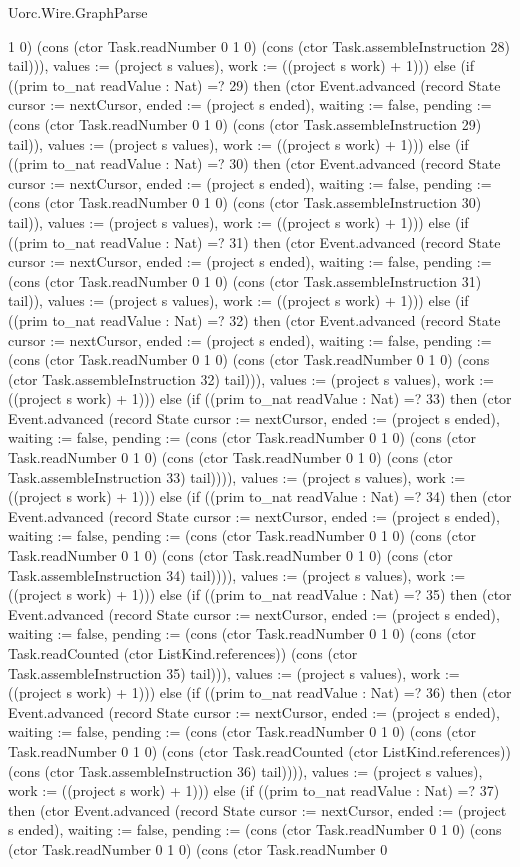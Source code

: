 \begin{lexlean}{Uorc.Wire.GraphParse}
\begin{semanticmodule}
{1 0) (cons (ctor Task.readNumber 0 1 0) (cons (ctor Task.assembleInstruction 28) tail))), values := (project s values), work := ((project s work) + 1)})) else (if ((prim to_nat readValue : Nat) =? 29) then (ctor Event.advanced (record State {cursor := nextCursor, ended := (project s ended), waiting := false, pending := (cons (ctor Task.readNumber 0 1 0) (cons (ctor Task.assembleInstruction 29) tail)), values := (project s values), work := ((project s work) + 1)})) else (if ((prim to_nat readValue : Nat) =? 30) then (ctor Event.advanced (record State {cursor := nextCursor, ended := (project s ended), waiting := false, pending := (cons (ctor Task.readNumber 0 1 0) (cons (ctor Task.assembleInstruction 30) tail)), values := (project s values), work := ((project s work) + 1)})) else (if ((prim to_nat readValue : Nat) =? 31) then (ctor Event.advanced (record State {cursor := nextCursor, ended := (project s ended), waiting := false, pending := (cons (ctor Task.readNumber 0 1 0) (cons (ctor Task.assembleInstruction 31) tail)), values := (project s values), work := ((project s work) + 1)})) else (if ((prim to_nat readValue : Nat) =? 32) then (ctor Event.advanced (record State {cursor := nextCursor, ended := (project s ended), waiting := false, pending := (cons (ctor Task.readNumber 0 1 0) (cons (ctor Task.readNumber 0 1 0) (cons (ctor Task.assembleInstruction 32) tail))), values := (project s values), work := ((project s work) + 1)})) else (if ((prim to_nat readValue : Nat) =? 33) then (ctor Event.advanced (record State {cursor := nextCursor, ended := (project s ended), waiting := false, pending := (cons (ctor Task.readNumber 0 1 0) (cons (ctor Task.readNumber 0 1 0) (cons (ctor Task.readNumber 0 1 0) (cons (ctor Task.assembleInstruction 33) tail)))), values := (project s values), work := ((project s work) + 1)})) else (if ((prim to_nat readValue : Nat) =? 34) then (ctor Event.advanced (record State {cursor := nextCursor, ended := (project s ended), waiting := false, pending := (cons (ctor Task.readNumber 0 1 0) (cons (ctor Task.readNumber 0 1 0) (cons (ctor Task.readNumber 0 1 0) (cons (ctor Task.assembleInstruction 34) tail)))), values := (project s values), work := ((project s work) + 1)})) else (if ((prim to_nat readValue : Nat) =? 35) then (ctor Event.advanced (record State {cursor := nextCursor, ended := (project s ended), waiting := false, pending := (cons (ctor Task.readNumber 0 1 0) (cons (ctor Task.readCounted (ctor ListKind.references)) (cons (ctor Task.assembleInstruction 35) tail))), values := (project s values), work := ((project s work) + 1)})) else (if ((prim to_nat readValue : Nat) =? 36) then (ctor Event.advanced (record State {cursor := nextCursor, ended := (project s ended), waiting := false, pending := (cons (ctor Task.readNumber 0 1 0) (cons (ctor Task.readNumber 0 1 0) (cons (ctor Task.readCounted (ctor ListKind.references)) (cons (ctor Task.assembleInstruction 36) tail)))), values := (project s values), work := ((project s work) + 1)})) else (if ((prim to_nat readValue : Nat) =? 37) then (ctor Event.advanced (record State {cursor := nextCursor, ended := (project s ended), waiting := false, pending := (cons (ctor Task.readNumber 0 1 0) (cons (ctor Task.readNumber 0 1 0) (cons (ctor Task.readNumber 0 }
\end{semanticmodule}
\end{lexlean}
